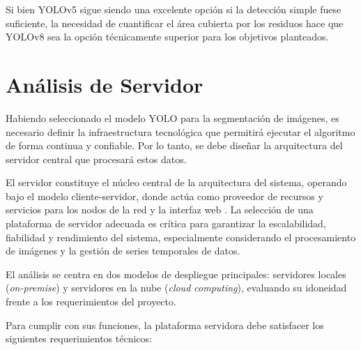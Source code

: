 Si bien YOLOv5 sigue siendo una excelente opción si la detección simple fuese suficiente, la necesidad de cuantificar el área cubierta por los residuos hace que YOLOv8 sea la opción técnicamente superior para los objetivos planteados.

\section{Análisis de Servidor}
\label{sec:analisis_de_servidor}
Habiendo seleccionado el modelo YOLO para la segmentación de imágenes, es necesario definir la infraestructura tecnológica que permitirá ejecutar el algoritmo de forma continua y confiable. Por lo tanto, se debe diseñar la arquitectura del servidor central que procesará estos datos.



El servidor constituye el núcleo central de la arquitectura del sistema, operando bajo el modelo cliente-servidor, donde actúa como proveedor de recursos y servicios para los nodos de la red y la interfaz web \cite{supermicro2024}. La selección de una plataforma de servidor adecuada es crítica para garantizar la escalabilidad, fiabilidad y rendimiento del sistema, especialmente considerando el procesamiento de imágenes y la gestión de series temporales de datos.

El análisis se centra en dos modelos de despliegue principales: servidores locales (\textit{on-premise}) y servidores en la nube (\textit{cloud computing}), evaluando su idoneidad frente a los requerimientos del proyecto.


Para cumplir con sus funciones, la plataforma servidora debe satisfacer los siguientes requerimientos técnicos:

